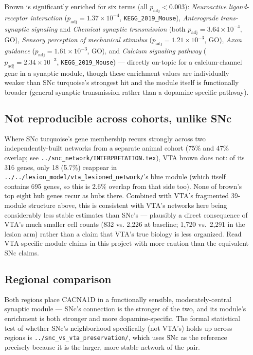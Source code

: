 \documentclass[11pt]{article}
\begin{document}
Brown is significantly enriched for six terms (all $p_{\mathrm{adj}} <
0.003$): \emph{Neuroactive ligand-receptor interaction}
($p_{\mathrm{adj}}=1.37\times10^{-4}$, \texttt{KEGG\_2019\_Mouse}),
\emph{Anterograde trans-synaptic signaling} and \emph{Chemical synaptic
transmission} (both $p_{\mathrm{adj}}=3.64\times10^{-4}$, GO),
\emph{Sensory perception of mechanical stimulus}
($p_{\mathrm{adj}}=1.21\times10^{-3}$, GO), \emph{Axon guidance}
($p_{\mathrm{adj}}=1.61\times10^{-3}$, GO), and \emph{Calcium signaling
pathway} ($p_{\mathrm{adj}}=2.34\times10^{-3}$, \texttt{KEGG\_2019\_Mouse})
--- directly on-topic for a calcium-channel gene in a synaptic module,
though these enrichment values are individually weaker than SNc turquoise's
strongest hit and the module itself is functionally broader (general
synaptic transmission rather than a dopamine-specific pathway).

\subsection*{Not reproducible across cohorts, unlike SNc}

Where SNc turquoise's gene membership recurs strongly across two
independently-built networks from a separate animal cohort (75\% and 47\%
overlap; see \texttt{../snc\_network/INTERPRETATION.tex}), VTA brown does
not: of its 316 genes, only 18 (5.7\%) reappear in
\texttt{../../lesion\_model/vta\_lesioned\_network/}'s blue module (which
itself contains 695 genes, so this is 2.6\% overlap from that side too).
None of brown's top eight hub genes recur as hubs there. Combined with
VTA's fragmented 39-module structure above, this is consistent with VTA's
networks here being considerably less stable estimates than SNc's ---
plausibly a direct consequence of VTA's much smaller cell counts (832 vs.
2{,}226 at baseline; 1{,}720 vs.\ 2{,}291 in the lesion arm) rather than a
claim that VTA's true biology is less organized. Read VTA-specific module
claims in this project with more caution than the equivalent SNc claims.

\subsection*{Regional comparison}

Both regions place CACNA1D in a functionally sensible, moderately-central
synaptic module --- SNc's connection is the stronger of the two, and its
module's enrichment is both stronger and more dopamine-specific. The formal
statistical test of whether SNc's neighborhood specifically (not VTA's)
holds up across regions is \texttt{../snc\_vs\_vta\_preservation/}, which
uses SNc as the reference precisely because it is the larger, more stable
network of the pair.
\end{document}
